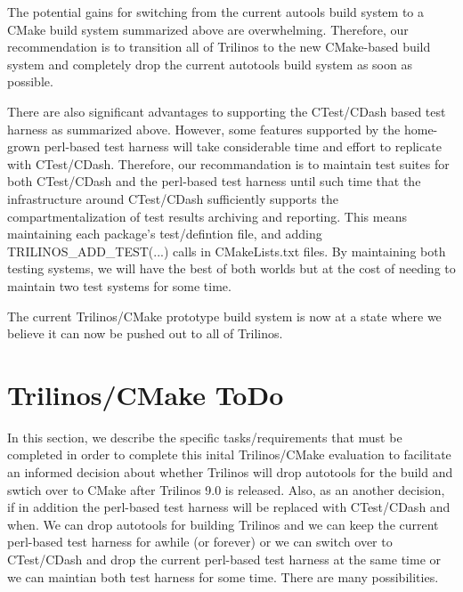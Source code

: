 \documentclass[pdf,ps2pdf,11pt]{SANDreport}
\begin{document}
The potential gains for switching from the current autools build
system to a CMake build system summarized above are overwhelming.
Therefore, our recommendation is to transition all of Trilinos to the
new CMake-based build system and completely drop the current autotools
build system as soon as possible.

There are also significant advantages to supporting the CTest/CDash
based test harness as summarized above.  However, some features
supported by the home-grown perl-based test harness will take
considerable time and effort to replicate with CTest/CDash.
Therefore, our recommandation is to maintain test suites for both
CTest/CDash and the perl-based test harness until such time that the
infrastructure around CTest/CDash sufficiently supports the
compartmentalization of test results archiving and reporting.  This
means maintaining each package's test/defintion file, and adding
TRILINOS\_ADD\_TEST(...) calls in CMakeLists.txt files.  By
maintaining both testing systems, we will have the best of both worlds
but at the cost of needing to maintain two test systems for some time.

The current Trilinos/CMake prototype build system is now at a state
where we believe it can now be pushed out to all of Trilinos.


%
\clearpage




%
\appendix



%
\section{Trilinos/CMake ToDo}
%

In this section, we describe the specific tasks/requirements that must
be completed in order to complete this inital Trilinos/CMake
evaluation to facilitate an informed decision about whether Trilinos
will drop autotools for the build and swtich over to CMake after
Trilinos 9.0 is released.  Also, as an another decision, if in
addition the perl-based test harness will be replaced with CTest/CDash
and when.  We can drop autotools for building Trilinos and we can keep
the current perl-based test harness for awhile (or forever) or we can
switch over to CTest/CDash and drop the current perl-based test
harness at the same time or we can maintian both test harness for some
time.  There are many possibilities.
\end{document}
